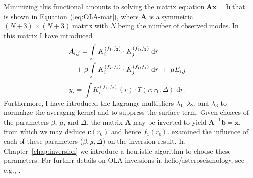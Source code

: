 Minimizing this functional amounts to solving the matrix equation ${\mathbf{A}\mathbf{x} = \mathbf{b}}$ that is shown in Equation~(\ref{eq:OLA-mat}), where $\mathbf{A}$ is a symmetric ${(N+3)\times (N+3)}$ matrix with $N$ being the number of observed modes. %
In this matrix I have introduced
\begin{align}
    \mathcal{A}_{i,j} 
    = 
    \int &\; K_i^{(f_1, f_2)} \cdot K_j^{(f_1, f_2)} %
    \; \text{d}r 
    \notag\\\;+\;\beta \int &\; K_i^{(f_2, f_1)} \cdot K_j^{(f_2, f_1)} \; \text{d}r 
    \; + \; \mu E_{i,j}
\end{align}
\begin{equation}
        y_i%
        = 
        \int K_i^{(f_1, f_2)}(r) \cdot T(r; r_0, \Delta) \; \text{d}r. 
\end{equation}
Furthermore, I have introduced the Lagrange multipliers $\lambda_1$, $\lambda_2$, and $\lambda_3$ to normalize the averaging kernel and to suppress the surface term. 
Given choices of the parameters $\beta$, $\mu$, and $\Delta$, the matrix $\mathbf{A}$ may be inverted %
to yield ${\mathbf{A}^{-1}\mathbf{b}=\mathbf{x}}$, from which we may deduce ${\mathbf c(r_0)}$ and hence ${f_1(r_0)}$. 
\citet{1998esasp.418..505r,1999MNRAS.309...35R} examined the influence of each of these parameters ($\beta, \mu, \Delta$) on the inversion result. 
In Chapter~\ref{chap:inversion} we introduce a heuristic algorithm to choose these parameters. 
For further details on OLA inversions in helio/asteroseismology, see e.g., \citet{basuchaplin2017}. 


